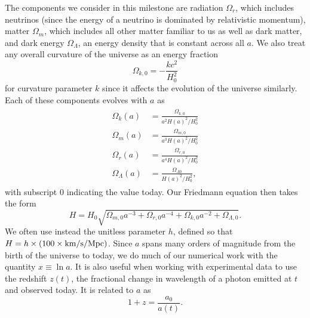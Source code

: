 \documentclass[aps,prl,twocolumn,groupedaddress,nofootinbib]{revtex4-2}
\newcommand{\Om}{\Omega_m}
\newcommand{\Omo}{\Omega_{m,0}}
\newcommand{\Or}{\Omega_r}
\newcommand{\Oro}{\Omega_{r,0}}
\newcommand{\Oko}{\Omega_{k,0}}
\newcommand{\Ol}{\Omega_\Lambda}
\newcommand{\Olo}{\Omega_{\Lambda,0}}
\begin{document}
The components we consider in this milestone are radiation $\Or$, which includes neutrinos (since the energy of a neutrino is dominated by relativistic momentum), matter $\Om$, which includes all other matter familiar to us as well as dark matter, and dark energy $\Ol$, an energy density that is constant across all $a$. We also treat any overall curvature of the universe as an energy fraction
\begin{equation*}
    \Omega_{k,0} = -\frac{kc^2}{H_0^2}
\end{equation*}
for curvature parameter $k$ since it affects the evolution of the universe similarly. Each of these components evolves with $a$ as
\begin{align}
    \begin{split}
        \label{eq:Omegas}
        \Omega_{k}(a)       & = \frac{\Omega_{k,0}}{a^2H(a)^2/H_0^2}     \\
        \Omega_{m}(a)       & = \frac{\Omega_{m,0}}{a^3H(a)^2/H_0^2}     \\
        \Omega_r(a)         & = \frac{\Omega_{r,0}}{a^4H(a)^2/H_0^2}     \\
        \Omega_{\Lambda}(a) & = \frac{\Omega_{\Lambda 0}}{H(a)^2/H_0^2},
    \end{split}
\end{align}
with subscript 0 indicating the value today. Our Friedmann equation then takes the form
\begin{equation}
    \label{eq:friedmann}
    H=H_0\sqrt{\Omo a^{-3} + \Oro a^{-4} + \Oko a^{-2} + \Olo}.
\end{equation}
We often use instead the unitless parameter $h$, defined so that $H=h\times(100\times\rm km/s/Mpc)$. Since $a$ spans many orders of magnitude from the birth of the universe to today, we do much of our numerical work with the quantity $x \equiv \ln a$. It is also useful when working with experimental data to use the redshift $z(t)$, the fractional change in wavelength of a photon emitted at $t$ and observed today. It is related to $a$ as
\begin{equation}
    1+z = \frac{a_0}{a(t)}.
\end{equation}
\end{document}
